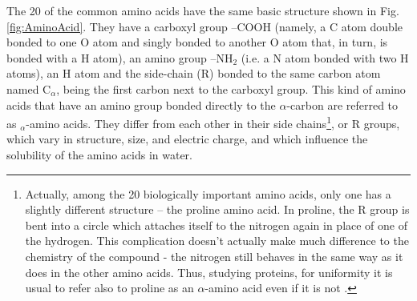 The 20 of the common amino acids have the same basic structure shown in Fig. \ref{fig:AminoAcid}. %
They have a carboxyl group --COOH (namely, a C atom double bonded to one O atom and singly bonded to another O atom that, in turn, is bonded with a H atom), an amino group --NH$_2$ (i.e. a N atom bonded with two H atoms), an H atom and the side-chain (R) bonded to the same carbon atom named C$_\alpha$, being the first carbon next to the carboxyl group. This kind of amino acids that have an amino group bonded directly to the $\alpha$-carbon are referred to as $_\alpha$-amino acids. They differ from each other in their side chains\footnote{Actually, among the 20 biologically important amino acids, only one has a slightly different structure -- the proline amino acid. In proline, the R group is bent into a circle which attaches itself to the nitrogen again in place of one of the hydrogen. This complication doesn't actually make much difference to the chemistry of the compound - the nitrogen still behaves in the same way as it does in the other amino acids. Thus, studying proteins,  for uniformity it is usual to refer also to proline as an $\alpha$-amino acid even if it is not
\cite{clark2016amino}.},
or R groups, which vary in structure, size, and electric charge, and which influence the solubility of the amino acids in water. 

